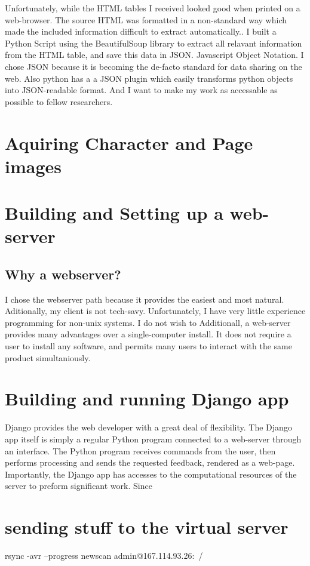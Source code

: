Unfortunately, while the HTML tables I received looked good when printed on a web-browser.  The source HTML was formatted in a non-standard way which made the included information difficult to extract automatically..  I built a Python Script using the BeautifulSoup library to extract all relavant information from the HTML table, and save this data in JSON.  Javascript Object Notation.  I chose JSON because it is becoming the de-facto standard for data sharing on the web.  Also python has a a JSON plugin which easily transforms python objects into JSON-readable format.  And I want to make my work as accessable as possible to fellow researchers.





\section{Aquiring Character and Page images}


\section{Building and Setting up a web-server}

\subsection{Why a webserver?}

I chose the webserver path because it provides the easiest and most natural.  Aditionally, my client is not tech-savy.  Unfortunately, I have very little experience programming for non-unix systems.  I do not wish to    Additionall, a web-server provides many advantages over a single-computer install.  It does not require a user to install any software, and permits many users to interact with the same product simultaniously.

\section{Building and running Django app}

Django provides the web developer with a great deal of flexibility.  The Django app itself is simply a regular Python program connected to a web-server through an interface.  The Python program receives commands from the user, then performs processing and sends the requested feedback, rendered as a web-page.  Importantly, the Django app has accesses to the computational resources of the server to preform significant work.  Since 

\section{sending stuff to the virtual server}


rsync -avr --progress newscan admin@167.114.93.26:~/





